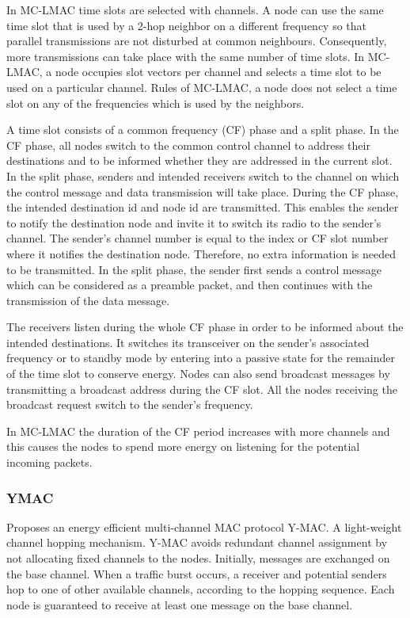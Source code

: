 In MC-LMAC time slots are selected with channels. A node can use the same time slot that is used by a 2-hop neighbor on a different frequency so that parallel transmissions are not disturbed at common neighbours. Consequently, more transmissions can take place with the same number of time slots. In MC-LMAC, a node occupies slot vectors per channel and selects a time slot to be used on a particular channel. Rules of MC-LMAC, a node does not select a time slot on any of the frequencies which is used by the neighbors. 

A time slot consists of a common frequency (CF) phase and a split phase. In the CF phase, all nodes switch to the common control channel to address their destinations and to be informed whether they are addressed in the current slot. In the split phase, senders and intended receivers switch to the channel on which the control message and data transmission will take place. During the CF phase, the intended destination id and node id are transmitted. This enables the sender to notify the destination node and invite it to switch its radio to the sender's channel. The sender's channel number is equal to the index or CF slot number where it notifies the destination node. Therefore, no extra information is needed to be transmitted. In the split phase, the sender first sends a control message which can be considered as a preamble packet, and then continues with the transmission of the data message. 

The receivers listen during the whole CF phase in order to be informed about the intended destinations. It switches its transceiver on the sender's associated frequency or to standby mode by entering into a passive state for the remainder of the time slot to conserve energy. Nodes can also send broadcast messages by transmitting a broadcast address during the CF slot. All the nodes receiving the broadcast request switch to the sender's frequency. 

In MC-LMAC the duration of the CF period increases with more channels and this causes the nodes to spend more energy on listening for the potential incoming packets. \cite{mc-lmac}

\subsubsection{YMAC}
Proposes an energy efficient multi-channel MAC protocol Y-MAC. A light-weight channel hopping mechanism. Y-MAC avoids redundant channel assignment by not allocating fixed channels to the nodes. Initially, messages are exchanged on the base channel. When a traffic burst occurs, a receiver and potential senders hop to one of other available channels, according to the hopping sequence. Each node is guaranteed to receive at least one message on the base channel. 

